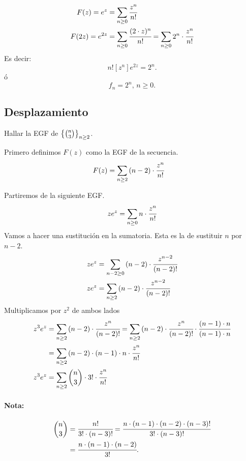 \begin{align*}
F(z)=e^z&=\sum_{n\geq0}{\cfrac{z^{n}}{n!}}\\
F(2z)=e^{2z}&=\sum_{n\geq0}{\cfrac{(2\cdot z)^n}{n!}}=\sum_{n\geq0}{2^n\cdot \cfrac{z^{n}}{n!}}\\
\end{align*}
Es decir:
$$n![z^n]e^{2z}=2^n.$$
ó
$$f_n=2^n,\,n\geq0.$$
\subsection{Desplazamiento}

Hallar la EGF de $\left\{\binom{n}{3}\right\}_{n\geq2}$.

Primero definimos $F(z)$ como la EGF de la secuencia.
\begin{align*}
F(z)&=\sum_{n\geq2}{\left(n-2\right)\cdot\cfrac{z^{n}}{n!}}
\end{align*}

Partiremos de la siguiente EGF.
\begin{align*}
ze^z=\sum_{n\geq0}{n\cdot\cfrac{z^{n}}{n!}}
\end{align*}
Vamos a hacer una sustitución en la sumatoria. Esta es la de sustituir $n$ por $n-2$.
\begin{align*}
ze^z&=\sum_{n-2\geq0}{(n-2)\cdot\cfrac{z^{n-2}}{(n-2)!}}\\
ze^z&=\sum_{n\geq2}{(n-2)\cdot\cfrac{z^{n-2}}{(n-2)!}}
\end{align*}
Multiplicamos por $z^2$ de ambos lados
\begin{align*}
z^3e^z&=\sum_{n\geq2}{(n-2)\cdot\cfrac{z^n}{(n-2)!}}=\sum_{n\geq2}{(n-2)\cdot\cfrac{z^n}{(n-2)!}\cdot\cfrac{(n-1)\cdot n}{(n-1)\cdot n}}\\
&=\sum_{n\geq2}{(n-2)\cdot(n-1)\cdot n\cdot \cfrac{z^{n}}{n!}}\\
z^3e^z&=\sum_{n\geq2}{\binom{n}{3}\cdot 3!\cdot \cfrac{z^{n}}{n!}}\\
\end{align*}

\paragraph{Nota:}
\begin{align*}
\binom{n}{3}&=\cfrac{n!}{3!\cdot (n-3)!}=\cfrac{n\cdot (n-1)\cdot (n-2)\cdot (n-3)!}{3!\cdot (n-3)!}\\
&=\cfrac{n\cdot (n-1)\cdot(n-2)}{3!}.
\end{align*}
